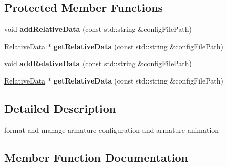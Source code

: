 \subsection*{Protected Member Functions}
\begin{DoxyCompactItemize}
\item 
\mbox{\label{classcocostudio_1_1ArmatureDataManager_a0a60c5159c640298b1d5313c7639e853}} 
void {\bfseries add\+Relative\+Data} (const std\+::string \&config\+File\+Path)
\item 
\mbox{\label{classcocostudio_1_1ArmatureDataManager_a1f33a565302c3c640f93eaab34899eec}} 
\hyperlink{structcocostudio_1_1RelativeData}{Relative\+Data} $\ast$ {\bfseries get\+Relative\+Data} (const std\+::string \&config\+File\+Path)
\item 
\mbox{\label{classcocostudio_1_1ArmatureDataManager_a0a60c5159c640298b1d5313c7639e853}} 
void {\bfseries add\+Relative\+Data} (const std\+::string \&config\+File\+Path)
\item 
\mbox{\label{classcocostudio_1_1ArmatureDataManager_ae5274a1a926994e103d2e13749849a13}} 
\hyperlink{structcocostudio_1_1RelativeData}{Relative\+Data} $\ast$ {\bfseries get\+Relative\+Data} (const std\+::string \&config\+File\+Path)
\end{DoxyCompactItemize}


\subsection{Detailed Description}
format and manage armature configuration and armature animation 

\subsection{Member Function Documentation}
\mbox{\label{classcocostudio_1_1ArmatureDataManager_a36a1eb7cdc144ce7ee0a17bcc3f5726d}} 
